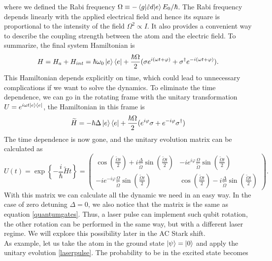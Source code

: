  where we defined the Rabi frequency $\Omega \equiv - \braket{g|\hat{\varepsilon} d|e}E_0/\hbar$. The Rabi frequency depends linearly with the applied electrical field and hence its square is proportional to the intensity of the field $\Omega ^2 \propto I$. It also provides a convenient way to describe the coupling strength between the atom and the electric field. To summarize, the final system Hamiltonian is
 \begin{equation}
 \label{2levelatomhamiltonian}
H = H_a + H_{int} = \hbar\omega_0 \ket{e}\bra{e} + \frac{\hbar \Omega}{2}(\sigma e^{i(\omega t+\varphi)} + \sigma^\dagger e^{-i(\omega t+\varphi)}).
 \end{equation}
This Hamiltonian depends explicitly on time, which could lead to unnecessary complications if we want to solve the dynamics. To eliminate the time dependence, we can go in the rotating frame with the unitary transformation $U = e^{i\omega t \ket{e}\bra{e}}$, the Hamiltonian in this frame is
\begin{equation}
\widetilde{H} = -\hbar \Delta \ket{e}\bra{e} + \frac{\hbar \Omega}{2}(e^{i\varphi}\sigma + e^{-i\varphi}\sigma^\dagger)
\end{equation}
The time dependence is now gone, and the unitary evolution matrix can be calculated as
\begin{equation}
\label{laserpulse}
U(t) = \exp\left\{-\frac{i}{\hbar} \widetilde{H} t \right\} =
 \begin{pmatrix}
  \cos\left(\frac{\widetilde{\Omega} t}{2}\right) + i \frac{\Delta}{\widetilde{\Omega}} \sin\left(\frac{\widetilde{\Omega} t}{2}\right) & -ie^{i\varphi}\frac{\Omega}{\widetilde{\Omega}}  \sin\left(\frac{\widetilde{\Omega} t}{2}\right) \\
  -ie^{-i\varphi}\frac{\Omega}{\widetilde{\Omega}}  \sin\left(\frac{\widetilde{\Omega} t}{2}\right)  & \cos\left(\frac{\widetilde{\Omega} t}{2}\right) - i \frac{\Delta}{\widetilde{\Omega}} \sin\left(\frac{\widetilde{\Omega} t}{2}\right)
\end{pmatrix}.
\end{equation}
With this matrix we can calculate all the dynamic we need in an easy way. In the case of zero detuning $\Delta = 0$, we also notice that the matrix is the same as equation \eqref{quantumgates}. Thus, a laser pulse can implement such qubit rotation, the other rotation can be performed in the same way, but with a different laser
regime. We will explore this possibility later in the AC Stark shift.\\
As example, let us take the atom in the ground state $\ket{\psi} = \ket{0}$ and apply the unitary evolution \eqref{laserpulse}. The probability to be in the excited state becomes
